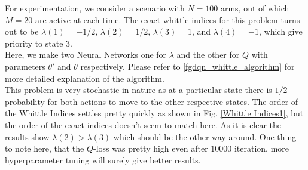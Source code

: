 \documentclass{article}
\theoremstyle{definition}
\begin{document}
For experimentation, we consider a scenario with $N=100$ arms, out of which $M=20$ are active
at each time. The exact whittle indices for this problem turns out to be $\lambda(1)=-1/2$, $\lambda(2)=1/2$, $\lambda(3)=1$, and $\lambda(4)=-1$, which
give priority to state 3.\\
Here, we make two Neural Networks one for $\lambda$ and the other for $Q$ with parameters $\theta'$ and $\theta$ respectively. Please refer to \ref{fgdqn_whittle_algorithm} for more detailed explanation of the algorithm.\\
This problem is very stochastic in nature as at a particular state there is $1/2$ probability for both actions to move to the other respective states. The order of the Whittle Indices settles pretty quickly as shown in Fig. \ref{Whittle Indices1}, but the order of the exact indices doesn't seem to match here. As it is clear the results show $\lambda(2)>\lambda(3)$ which should be the other way around. One thing to note here, that the $Q$-loss was pretty high even after $10000$ iteration, more hyperparameter tuning will surely give better results.
\end{document}

